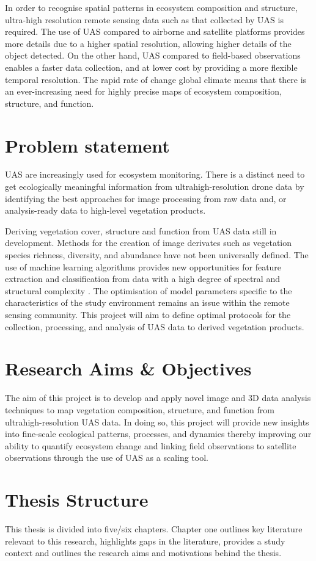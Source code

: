 In order to recognise spatial patterns in ecosystem  composition and structure, ultra-high resolution remote sensing data such as that collected by UAS is required. The use of UAS compared to airborne and satellite platforms provides more details due to a higher spatial resolution, allowing higher details of the object detected. On the other hand, UAS compared to field-based observations enables a faster data collection, and at lower cost by providing a more flexible temporal resolution.
The rapid rate of change global climate means that there is an ever-increasing need for highly precise maps of ecosystem composition, structure, and function.


\section{Problem statement}
UAS are increasingly used for ecosystem monitoring. There is a distinct need to get ecologically meaningful information from ultrahigh-resolution drone data by identifying the best approaches for image processing from raw data and, or analysis-ready data to high-level vegetation products. 

Deriving vegetation cover, structure and function from UAS data still in development. Methods for the creation of image derivates such as vegetation species richness, diversity, and abundance have not been universally defined. The use of machine learning algorithms provides new opportunities for feature extraction and classification from data with a high degree of spectral and structural complexity \citep{ghamisi2017Advanced}. The optimisation of model parameters specific to the characteristics of the study environment remains an issue within the remote sensing community. This project will aim to define optimal protocols for the collection, processing, and analysis of UAS data to derived vegetation products.  
 


\section{Research Aims \& Objectives}
The aim of this project is to develop and apply novel image and 3D data analysis techniques to map vegetation composition, structure, and function from ultrahigh-resolution UAS data. In doing so, this project will provide new insights into fine-scale ecological patterns, processes, and dynamics thereby improving our ability to quantify ecosystem change and linking field observations to satellite observations through the use of UAS as a scaling tool.


\section{Thesis Structure}
This thesis is divided into five/six  chapters.
Chapter one outlines key literature relevant to this research, highlights gaps in the literature, provides a study context and outlines the research aims and motivations behind the thesis. 

\newpage